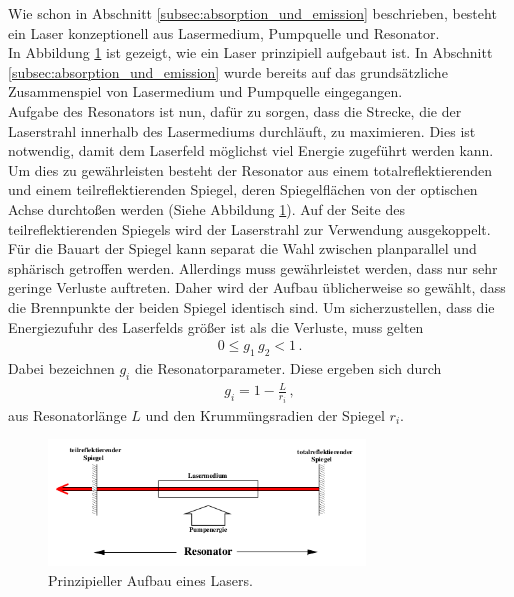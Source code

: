 Wie schon in Abschnitt \ref{subsec:absorption_und_emission}
beschrieben, besteht ein Laser konzeptionell aus Lasermedium,
Pumpquelle und Resonator.\\
In Abbildung \ref{fig:laserkonzept} ist gezeigt,
wie ein Laser prinzipiell aufgebaut ist.
In Abschnitt \ref{subsec:absorption_und_emission}
wurde bereits auf das grundsätzliche Zusammenspiel von Lasermedium
und Pumpquelle eingegangen.\\
Aufgabe des Resonators ist nun, dafür zu sorgen, dass
die Strecke, die der Laserstrahl innerhalb
des Lasermediums durchläuft, zu maximieren. Dies ist notwendig,
damit dem Laserfeld möglichst viel Energie zugeführt
werden kann. Um dies zu gewährleisten besteht der Resonator
aus einem totalreflektierenden und einem teilreflektierenden Spiegel,
deren Spiegelflächen von der optischen Achse durchtoßen werden
(Siehe Abbildung \ref{fig:laserkonzept}).
Auf der Seite des teilreflektierenden Spiegels wird der Laserstrahl
zur Verwendung ausgekoppelt.\\
Für die Bauart der Spiegel kann separat die Wahl zwischen planparallel und
sphärisch getroffen werden. Allerdings muss gewährleistet werden, dass
nur sehr geringe Verluste auftreten. Daher wird
der Aufbau üblicherweise so gewählt, dass die Brennpunkte der beiden Spiegel
identisch sind.
Um sicherzustellen, dass die Energiezufuhr des Laserfelds größer ist als
die Verluste, muss gelten
\begin{align}
  0 \leq g_{1} \, g_{2} \less 1 \, .\label{eqn:stabil}
\end{align}
Dabei bezeichnen $g_{i}$ die Resonatorparameter.
Diese ergeben sich durch
\begin{align}
  g_{i} = 1 - \frac{L}{r_{i}} \, ,\label{eqn:stabil_params}
\end{align}
aus Resonatorlänge $L$ und den Krummüngsradien der Spiegel $r_{i}$.

\FloatBarrier
\begin{figure}
  \centering
  \includegraphics[width=0.75\textwidth]{figures/laserkonzept.png}
  \caption{Prinzipieller Aufbau eines Lasers.\cite{sample}}
  \label{fig:laserkonzept}
\end{figure}
\FloatBarrier

